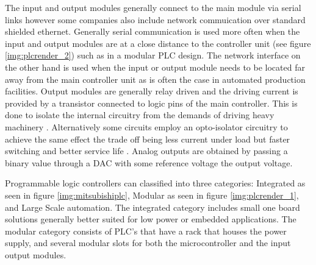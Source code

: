 The input and output modules generally connect to the main module via serial links however some companies also include network commuication over standard shielded ethernet\cite{rockwell_io,rockwell_tech_pub}. Generally serial communication is used more often when the input and output modules are at a close distance to the controller unit (see figure \ref{img:plcrender_2}) such as in a modular PLC design. The network interface on the other hand is used when the input or output module needs to be located far away from the main controller unit\cite{rockwell_tech_pub} as is often the case in automated production facilities. Output modules are generally relay driven and the driving current is provided by a transistor connected to logic pins of the main controller. This is done to isolate the internal circuitry from the demands of driving heavy machinery \cite{plcapp}. Alternatively some circuits employ an opto-isolator circuitry to achieve the same effect the trade off being less current under load but faster switching and better service life \cite{plcapp}. Analog outputs are obtained by passing a binary value through a DAC with some reference voltage the output voltage.


Programmable logic controllers can classified into three categories: Integrated as seen in figure \ref{img:mitsubishiplc}, Modular as seen in figure \ref{img:plcrender_1}, and Large Scale automation. The integrated category includes small one board solutions generally better suited for low power or embedded applications. The modular category consists of PLC's that have a rack that houses the power supply, and several modular slots for both the microcontroller and the input output modules.



